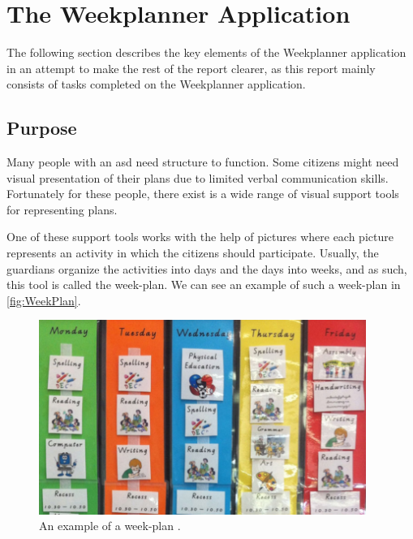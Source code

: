 \section{The Weekplanner Application}\label{sec:TheWeekplannerApplication}

The following section describes the key elements of the Weekplanner application in an attempt to make the rest of the report clearer, as this report mainly consists of tasks completed on the Weekplanner application.

\subsection{Purpose}

Many people with an \gls{asd} need structure to function. Some \glspl{citizen} might need visual presentation\cite{VisualSupport} of their plans due to limited verbal communication skills. Fortunately for these people, there exist is a wide range of visual support tools for representing plans. 

One of these support tools works with the help of pictures where each picture represents an activity in which the \glspl{citizen} should participate. Usually, the \glspl{guardian} organize the activities into days and the days into weeks, and as such, this tool is called the week-plan. We can see an example of such a week-plan in \autoref{fig:WeekPlan}.

\begin{figure}[H]
    \begin{center}
        \includegraphics[width=0.95\textwidth]{figures/WeekPlanEks.png}
    \end{center}
    \caption{An example of a week-plan \cite{VisualSupport}.}
    \label{fig:WeekPlan}
\end{figure}

